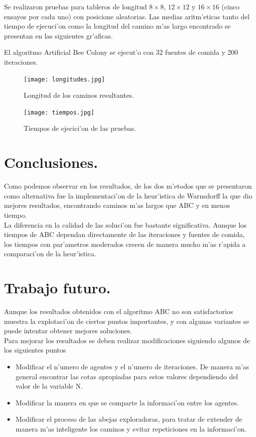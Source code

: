 \documentclass[12pt]{article}
\begin{document}
    Se realizaron pruebas para tableros de longitud $8 \times 8$, $12\times 12$ y $16 \times 16$ (cinco ensayos por cada uno) con posicione aleatorias.
    Las medias aritm'eticas tanto del tiempo de ejecuci'on como la longitud del camino m'as largo encontrado se
    presentan en las siguientes gr'aficas.

    El algoritmo Artificial Bee Colony se ejecut'o con 32 fuentes de comida y 200 iteraciones.

    \begin{figure}[H]
        \centering
        \texttt{[image: longitudes.jpg]}
        \caption{Longitud de los caminos resultantes.}
        \label{fig:longitudes}
    \end{figure}

    \begin{figure}[H]
        \centering
        \texttt{[image: tiempos.jpg]}
        \caption{Tiempos de ejecici'on de las pruebas.}
        \label{fig:tiempos}
    \end{figure}



    \section{Conclusiones.}
    Como podemos observar en los resultados,
    de los  dos m'etodos que se presentaron como alternativa
    fue la implementaci'on de la heur'istica de Warnsdorff la que dio mejores resultados,
    encontrando caminos m'as largos que ABC y en menos tiempo. \\

    La diferencia en la calidad de las soluci'on fue bastante significativa. Aunque los tiempos de ABC dependan directamente de las iteraciones
    y fuentes de comida, los tiempos con par'ametros moderados crecen de manera mucho m'as r'apida a comparaci'on de la
    heur'istica.


    \section{Trabajo futuro.}
    Aunque los resultados obtenidos con el algoritmo ABC no son satisfactorios muestra la explotaci'on de ciertos puntos importantes, y
    con algunas variantes se puede intentar obtener mejores soluciones. \\
    Para mejorar los resultados se deben realizar modificaciones siguiendo algunos de los siguientes puntos
    \begin{itemize}
        \item Modificar el n'umero de agentes y el n'umero de iteraciones. De manera m'as general
            encontrar las cotas apropiadas para estos
            valores dependiendo del valor de la variable N.
        \item Modificar la manera en que se comparte la informaci'on entre los agentes.
        \item Modificar el proceso de las abejas exploradoras, para tratar de extender de manera m'as inteligente
            los caminos y evitar repeticiones en la informaci'on.
    \end{itemize}
\end{document}
